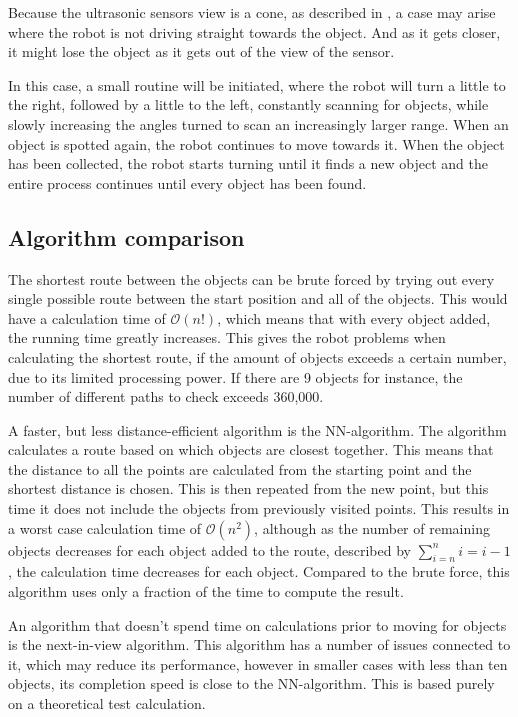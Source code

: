 Because the ultrasonic sensors view is a cone, as described in , a case may arise where the robot is not driving straight towards the object. And as it gets closer, it might lose the object as it gets out of the view of the sensor.

In this case, a small routine will be initiated, where the robot will turn a little to the right, followed by a little to the left, constantly scanning for objects, while slowly increasing the angles turned to scan an increasingly larger range. When an object is spotted again, the robot continues to move towards it. When the object has been collected, the robot starts turning until it finds a new object and the entire process continues until every object has been found.


\subsection{Algorithm comparison} \label{sec:algorithm-desc}

The shortest route between the objects can be brute forced by trying out every single possible route between the start position and all of the objects. This would have a calculation time of $\mathcal{O}(n!)$, which means that with every object added, the running time greatly increases. This gives the robot problems when calculating the shortest route, if the amount of objects exceeds a certain number, due to its limited processing power. If there are 9 objects for instance, the number of different paths to check exceeds 360,000.  

A faster, but less distance-efficient algorithm is the NN-algorithm. The algorithm calculates a route based on which objects are closest together. This means that the distance to all the points are calculated from the starting point and the shortest distance is chosen. This is then repeated from the new point, but this time it does not include the objects from previously visited points. This results in a worst case calculation time of $\mathcal{O}(n^2)$, although as the number of remaining objects decreases for each object added to the route, described by $\sum\limits_{i=n}^n i = i - 1$, the calculation time decreases for each object. Compared to the brute force, this algorithm uses only a fraction of the time to compute the result. 

An algorithm that doesn't spend time on calculations prior to moving for objects is the next-in-view algorithm. This algorithm has a number of issues connected to it, which may reduce its performance, however in smaller cases with less than ten objects, its completion speed is close to the NN-algorithm. This is based purely on a theoretical test calculation.

